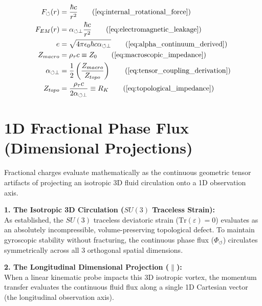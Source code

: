 \documentclass[11pt, a4paper]{article}
\begin{document}
\begin{tcolorbox}[recallbox, title={\ref{box:fine_structure}. Topological Coupling ($\alpha_{\circlearrowleft \perp}$) \& Electric Charge}]
\begin{align}
    F_{\circlearrowleft}(r) &= \frac{\hbar c}{r^2} \tag{\ref{eq:internal_rotational_force}} \\
    F_{EM}(r) &= \alpha_{\circlearrowleft \perp} \frac{\hbar c}{r^2} \tag{\ref{eq:electromagnetic_leakage}} \\
    e &= \sqrt{4\pi \epsilon_0 \hbar c \alpha_{\circlearrowleft \perp}} \tag{\ref{eq:alpha_continuum_derived}} \\
    Z_{macro} &= \rho_{\tau} c \equiv Z_0 \tag{\ref{eq:macroscopic_impedance}} \\
    \alpha_{\circlearrowleft \perp} &= \frac{1}{2} \left( \frac{Z_{macro}}{Z_{topo}} \right) \tag{\ref{eq:tensor_coupling_derivation}} \\
    Z_{topo} &= \frac{\rho_{\tau} c}{2 \alpha_{\circlearrowleft \perp}} \equiv R_K \tag{\ref{eq:topological_impedance}}
\end{align}
\end{tcolorbox}


\section{1D Fractional Phase Flux (Dimensional Projections)}
\label{sec:deriv_tensor_projections}

Fractional charges evaluate mathematically as the continuous geometric tensor artifacts of projecting an isotropic 3D fluid circulation onto a 1D observation axis.

\textbf{1. The Isotropic 3D Circulation ($SU(3)$ Traceless Strain):} \\
As established, the $SU(3)$ traceless deviatoric strain ($\text{Tr}(\varepsilon) = 0$) evaluates as an absolutely incompressible, volume-preserving topological defect. To maintain gyroscopic stability without fracturing, the continuous phase flux ($\Phi_{\circlearrowleft}$) circulates symmetrically across all $3$ orthogonal spatial dimensions.

\textbf{2. The Longitudinal Dimensional Projection ($\parallel$):} \\
When a linear kinematic probe impacts this 3D isotropic vortex, the momentum transfer evaluates the continuous fluid flux along a single 1D Cartesian vector (the longitudinal observation axis).
\end{document}

